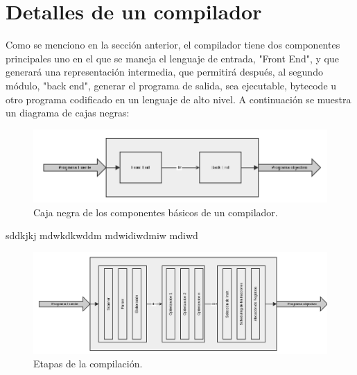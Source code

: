 \documentclass[fleqn]{tcdl}
\begin{document}
\newpage
\section*{Detalles de un compilador}
\fontsize{11}{14}\selectfont

Como se menciono en la sección anterior, el compilador tiene dos componentes principales uno en el que se maneja el lenguaje de entrada, "Front End", y que generará una representación intermedia, que permitirá después, al segundo módulo, "back end", generar el programa de salida, sea ejecutable, bytecode u otro programa codificado en un lenguaje de alto nivel. A continuación se muestra un diagrama de cajas negras:

\begin{figure}
\captionsetup{type=figure}
\includegraphics[width=\textwidth]{compilador_detallado.png}
\caption{\label{fig:inter}Caja negra de los componentes básicos de un compilador.}
\end{figure}
sddkjkj
mdwkdkwddm
mdwidiwdmiw
mdiwd
\begin{figure}
\captionsetup{type=figure}
\includegraphics[width=\textwidth]{mucho_mas_detallado.png}
\caption{\label{fig:inter}Etapas de la compilación.}
\end{figure}
\bigskip
\end{document}
